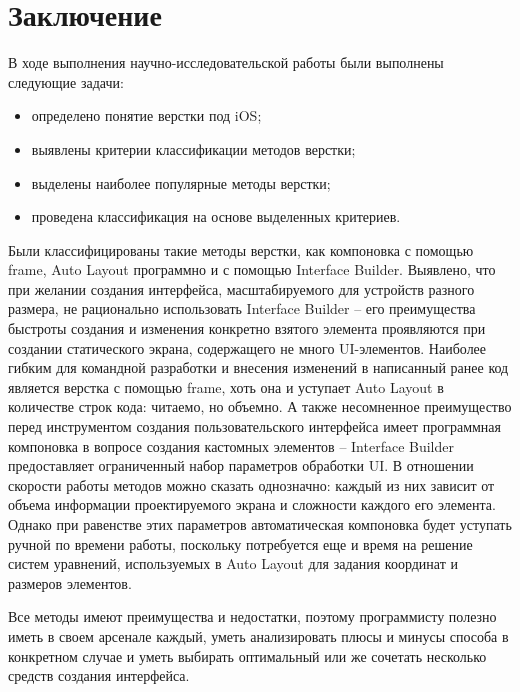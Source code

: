 \chapter*{Заключение}

В ходе выполнения научно-исследовательской работы были выполнены следующие задачи: 

\begin{itemize}[label=---]
	\item определено понятие верстки под iOS;
	\item выявлены критерии классификации методов верстки;
	\item выделены наиболее популярные методы верстки;
	\item проведена классификация на основе выделенных критериев.	
\end{itemize}

Были классифицированы такие методы верстки, как компоновка с помощью frame, Auto Layout программно и с помощью Interface Builder. 
Выявлено, что при желании создания интерфейса, масштабируемого для устройств разного размера, не рационально использовать Interface Builder -- его преимущества быстроты создания и изменения конкретно взятого элемента проявляются при создании статического экрана, содержащего не много UI-элементов. 
Наиболее гибким для командной разработки и внесения изменений в написанный ранее код является верстка с помощью frame, хоть она и уступает Auto Layout в количестве строк кода: читаемо, но объемно. 
А также несомненное преимущество перед инструментом создания пользовательского интерфейса имеет программная компоновка в вопросе создания кастомных элементов -- Interface Builder предоставляет ограниченный набор параметров обработки UI. 
В отношении скорости работы методов можно сказать однозначно: каждый из них зависит от объема информации проектируемого экрана и сложности каждого его элемента. 
Однако при равенстве этих параметров автоматическая компоновка будет уступать ручной по времени работы, поскольку потребуется еще и время на решение систем уравнений, используемых в Auto Layout для задания координат и размеров элементов. 

Все методы имеют преимущества и недостатки, поэтому программисту полезно иметь в своем арсенале каждый, уметь анализировать плюсы и минусы способа в конкретном случае и уметь выбирать оптимальный или же сочетать несколько средств создания интерфейса. 
